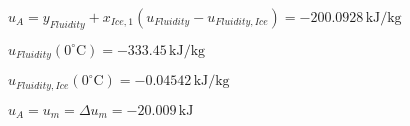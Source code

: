 \( u_A = y_{Fluidity} + x_{Ice,1}(u_{Fluidity} - u_{Fluidity,Ice}) = -200.0928 \, \text{kJ/kg} \)  

\( u_{Fluidity}(0^\circ \text{C}) = -333.45 \, \text{kJ/kg} \)  

\( u_{Fluidity,Ice}(0^\circ \text{C}) = -0.04542 \, \text{kJ/kg} \)  

\( u_A = u_m = \Delta u_m = -20.009 \, \text{kJ} \)